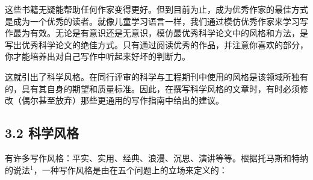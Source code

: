 这些书籍无疑能帮助任何作家变得更好。但到目前为止，成为优秀作家的最佳方式是成为一个优秀的读者。就像儿童学习语言一样，我们通过模仿优秀作家来学习写作最为有效。无论是有意识还是无意识，模仿最优秀科学论文中的风格和方法，是写出优秀科学论文的绝佳方式。只有通过阅读优秀的作品，并注意你喜欢的部分，你才能培养出对自己写作中听起来好坏的判断力。

这就引出了科学风格。在同行评审的科学与工程期刊中使用的风格是该领域所独有的，具有其自身的期望和质量标准。因此，在撰写科学风格的文章时，有时必须修改（偶尔甚至放弃）那些更通用的写作指南中给出的建议。

\subsection*{3.2 科学风格}
有许多写作风格：平实、实用、经典、浪漫、沉思、演讲等等。根据托马斯和特纳的说法${ }^{1}$，一种写作风格是由在五个问题上的立场来定义的：

